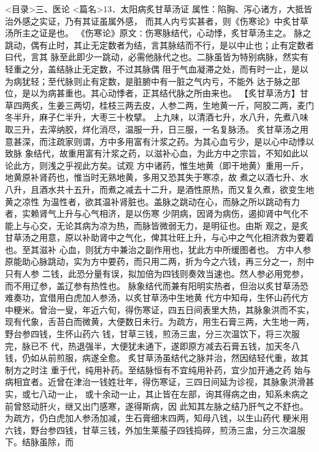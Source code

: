 \documentclass[a4paper,12pt,UTF8,twoside]{ctexbook}
\begin{document}
<目录>三、医论
<篇名>13．太阳病炙甘草汤证
属性：陷胸、泻心诸方，大抵皆治外感之实证，乃有其证虽属外感， 
而其人内亏实甚者，则《伤寒论》中炙甘草汤所主之证是也。 
《伤寒论》原文∶伤寒脉结代，心动悸，炙甘草汤主之。 
脉之跳动，偶有止时，其止无定数者为结，言其脉结而不行，是以中止也；止有定数者曰代，言其 
脉至此即少一跳动，必需他脉代之也。二脉虽皆为特别病脉，然实有轻重之分，盖结脉止无定数，不过其脉偶 
阻于气血凝滞之处，而有时一止，是以为病犹轻；至代脉则止有定数，是脏腑中有一脏之气内亏，不能外 
达于脉之部位，是以为病甚重也。其心动悸者，正其结代脉之所由来也。 
【炙甘草汤方】甘草四两炙，生姜三两切，桂枝三两去皮，人参二两，生地黄一斤，阿胶二两，麦门 
冬半升，麻子仁半升，大枣三十枚擘。 
上九味，以清酒七升，水八升，先煮八味取三升，去滓纳胶，烊化消尽，温服一升，日三服，一名复脉汤。 
炙甘草汤之用意甚深，而注疏家则谓，方中多用富有汁浆之药。为其心血亏少，是以心中动悸以致脉 
象结代，故重用富有汁浆之药，以滋补心血，为此方中之宗旨，不知如此以论此方，则浅之乎视此方矣。试观 
方中诸药，惟生地黄（即干地黄）重用一斤，地黄原补肾药也，惟当时无熟地黄，多用又恐其失于寒凉，故 
煮之以酒七升、水八升，且酒水共十五升，而煮之减去十二升，是酒性原热，而又复久煮，欲变生地黄之凉性 
为温性者，欲其温补肾脏也。盖脉之跳动在心，而脉之所以跳动有力者，实赖肾气上升与心气相济，是以伤寒 
少阴病，因肾为病伤，遏抑肾中气化不能上与心交，无论其病为凉为热，而脉皆微弱无力，是明征也。由斯 
观之，是炙甘草汤之用意，原以补助肾中之气化，俾其壮旺上升，与心中之气化相济救为要着也。至其滋补 
心血，则犹方中兼治之副作用也，犹此方中所缓图者也。 
方中人参原能助心脉跳动，实为方中要药，而只用二两，折为今之六钱，再三分之一，剂中只有人参 
二钱，此恐分量有误，拟加倍为四钱则奏效当速也。然人参必用党参，而不用辽参，盖辽参有热性也。 
脉象结代而兼有阳明实热者，但治以炙甘草汤恐难奏功，宜借用白虎加人参汤，以炙甘草汤中生地黄 
代方中知母，生怀山药代方中粳米。曾治一叟，年近六旬，得伤寒证，四五日间表里大热，其脉象洪而不实， 
现有代象，舌苔白而微黄，大便数日未行。为疏方，用生石膏三两，大生地一两，野台参四钱，生怀山药六 
钱，甘草三钱，煎汤三盅，分三次温饮下，将三次服完，脉已不 
代，热退强半，大便犹未通下，遂即原方减去石膏五钱，加天冬八钱，仍如从前煎服，病遂全愈。 
炙甘草汤虽结代之脉并治，然因结轻代重，故其制方之时注 
重于代，纯用补药。至结脉恒有不宜纯用补药，宜少加开通之药 
始与病相宜者。近曾在津治一钱姓壮年，得伤寒证，三四日间延为诊视，其脉象洪滑甚实，或七八动一止， 
或十余动一止，其止皆在左部，询其得病之由，知系未病之前曾怒动肝火，继又出门感寒，遂得斯病，因 
此知其左脉之结乃肝气之不舒也。为疏方，仍白虎加人参汤加减，生石膏细末四两，知母八钱，以生山药代 
粳米用六钱，野台参四钱，甘草三钱，外加生莱菔子四钱捣碎，煎汤三盅，分三次温服下。结脉虽除，而 
\end{document}
